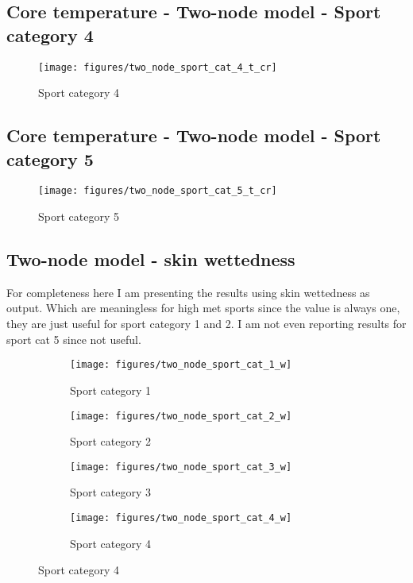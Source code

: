 \documentclass[11pt]{article}
\begin{document}
    \subsection{Core temperature - Two-node model - Sport category 4}
    \begin{figure}[htb!]
        \centering
        \texttt{[image: figures/two\_node\_sport\_cat\_4\_t\_cr]}
        \caption{Sport category 4}\label{fig:two_node_sport_cat_4}
    \end{figure}

    \clearpage

    \subsection{Core temperature - Two-node model - Sport category 5}
    \begin{figure}[htb!]
        \centering
        \texttt{[image: figures/two\_node\_sport\_cat\_5\_t\_cr]}
        \caption{Sport category 5}\label{fig:two_node_sport_cat_5}
    \end{figure}

    \clearpage

    \subsection{Two-node model - skin wettedness}
    For completeness here I am presenting the results using skin wettedness as output.
    Which are meaningless for high met sports since the value is always one, they are just useful for sport category 1 and 2.
    I am not even reporting results for sport cat 5 since not useful.

    \begin{figure}[htb!]
        \centering

        \begin{subfigure}{.5\textwidth}
            \centering
            \texttt{[image: figures/two\_node\_sport\_cat\_1\_w]}
            \caption{Sport category 1}\label{fig:two_node_sport_cat_1_w}
        \end{subfigure}%
        \hfill
        \begin{subfigure}{.5\textwidth}
            \centering
            \texttt{[image: figures/two\_node\_sport\_cat\_2\_w]}
            \caption{Sport category 2}\label{fig:two_node_sport_cat_2_w}
        \end{subfigure}%
        \hfill
        \begin{subfigure}{.5\textwidth}
            \centering
            \texttt{[image: figures/two\_node\_sport\_cat\_3\_w]}
            \caption{Sport category 3}\label{fig:two_node_sport_cat_3_w}
        \end{subfigure}%
        \hfill
        \begin{subfigure}{.5\textwidth}
            \centering
            \texttt{[image: figures/two\_node\_sport\_cat\_4\_w]}
            \caption{Sport category 4}\label{fig:two_node_sport_cat_4_w}
        \end{subfigure}%
    \end{figure}
\end{document}
